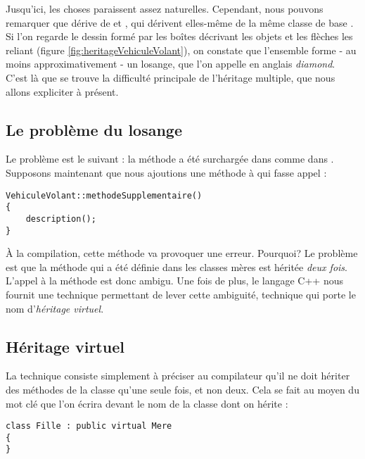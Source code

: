 Jusqu'ici, les choses paraissent assez naturelles. Cependant, nous pouvons
remarquer que  d\'erive de   et
, qui d\'erivent elles-m\^eme de la m\^eme classe de
base . Si l'on regarde le dessin form\'e par les bo\^ites
d\'ecrivant les objets et les fl\`eches les reliant (figure
\ref{fig:heritageVehiculeVolant}), on constate que l'ensemble forme - au moins
approximativement - un losange, que l'on appelle en anglais \textit{diamond}.
C'est l\`a que se trouve la difficult\'e principale de l'h\'eritage multiple,
que nous allons expliciter \`a pr\'esent.

\subsection{Le probl\`eme du losange}

Le probl\`eme est le suivant : la m\'ethode  a
\'et\'e surcharg\'ee dans  comme dans
. Supposons maintenant que nous ajoutions une m\'ethode \`a
 qui fasse appel  :

\begin{lstlisting}
VehiculeVolant::methodeSupplementaire()
{
	description();
}
\end{lstlisting}

\`A la compilation, cette m\'ethode va provoquer une erreur. Pourquoi? Le
probl\`eme est que la m\'ethode  qui a \'et\'e
d\'efinie dans les classes m\`eres est h\'erit\'ee \emph{deux fois}. L'appel
\`a la m\'ethode  est donc ambigu. Une fois de plus, le langage C++ nous fournit une technique permettant de lever cette ambiguit\'e, technique qui porte le nom d'\emph{h\'eritage virtuel}.

\subsection{H\'eritage virtuel}

La technique consiste simplement \`a pr\'eciser au compilateur qu'il ne doit
h\'eriter des m\'ethodes de la classe  qu'une seule fois,
et non deux. Cela se fait au moyen du mot cl\'e  que l'on
\'ecrira devant le nom de la classe dont on h\'erite :

\begin{lstlisting}
class Fille : public virtual Mere
{
}
\end{lstlisting}

